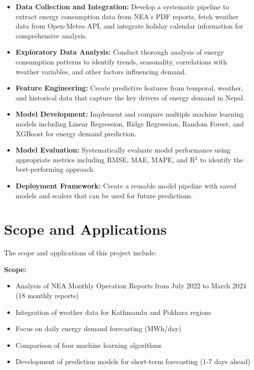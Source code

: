         \begin{itemize}
            \item \textbf{Data Collection and Integration:} Develop a systematic pipeline to extract energy consumption data from NEA's PDF reports, fetch weather data from Open-Meteo API, and integrate holiday calendar information for comprehensive analysis.

            \item \textbf{Exploratory Data Analysis:} Conduct thorough analysis of energy consumption patterns to identify trends, seasonality, correlations with weather variables, and other factors influencing demand.

            \item \textbf{Feature Engineering:} Create predictive features from temporal, weather, and historical data that capture the key drivers of energy demand in Nepal.

            \item \textbf{Model Development:} Implement and compare multiple machine learning models including Linear Regression, Ridge Regression, Random Forest, and XGBoost for energy demand prediction.

            \item \textbf{Model Evaluation:} Systematically evaluate model performance using appropriate metrics including RMSE, MAE, MAPE, and R$^2$ to identify the best-performing approach.

            \item \textbf{Deployment Framework:} Create a reusable model pipeline with saved models and scalers that can be used for future predictions.
        \end{itemize}

    \section{Scope and Applications}
        The scope and applications of this project include:

        \textbf{Scope:}
        \begin{itemize}
            \item Analysis of NEA Monthly Operation Reports from July 2022 to March 2024 (18 monthly reports)
            \item Integration of weather data for Kathmandu and Pokhara regions
            \item Focus on daily energy demand forecasting (MWh/day)
            \item Comparison of four machine learning algorithms
            \item Development of prediction models for short-term forecasting (1-7 days ahead)
        \end{itemize}

